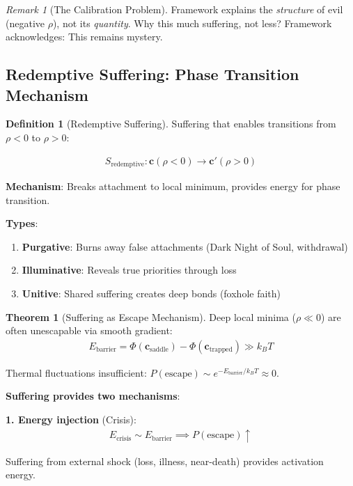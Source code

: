 \documentclass[11pt,a4paper]{article}
\theoremstyle{definition}
\newtheorem{definition}{Definition}[section]
\newtheorem{theorem}{Theorem}[section]
\theoremstyle{remark}
\newtheorem{remark}{Remark}[section]
\newcommand{\cc}{\mathbf{c}}
\begin{document}
\begin{small}
\begin{enumerate}
\begin{remark}[The Calibration Problem]
Framework explains the \textit{structure} of evil (negative \(\rho\)), not its \textit{quantity}. Why this much suffering, not less? Framework acknowledges: This remains mystery.
\end{remark}

\subsection{Redemptive Suffering: Phase Transition Mechanism}

\begin{definition}[Redemptive Suffering]
Suffering that enables transitions from \(\rho < 0\) to \(\rho > 0\):

\begin{align}
S_{\text{redemptive}}: \cc(\rho < 0) \to \cc'(\rho > 0)
\end{align}

\textbf{Mechanism}: Breaks attachment to local minimum, provides energy for phase transition.

\textbf{Types}:
\begin{enumerate}
    \item \textbf{Purgative}: Burns away false attachments (Dark Night of Soul, withdrawal)
    \item \textbf{Illuminative}: Reveals true priorities through loss
    \item \textbf{Unitive}: Shared suffering creates deep bonds (foxhole faith)
\end{enumerate}
\end{definition}

\begin{theorem}[Suffering as Escape Mechanism]
Deep local minima (\(\rho \ll 0\)) are often unescapable via smooth gradient:
\begin{align}
E_{\text{barrier}} = \Phi(\cc_{\text{saddle}}) - \Phi(\cc_{\text{trapped}}) \gg k_B T
\end{align}

Thermal fluctuations insufficient: \(P(\text{escape}) \sim e^{-E_{\text{barrier}}/k_B T} \approx 0\).

\textbf{Suffering provides two mechanisms}:

\textbf{1. Energy injection} (Crisis):
\begin{align}
E_{\text{crisis}} \sim E_{\text{barrier}} \implies P(\text{escape}) \uparrow
\end{align}

Suffering from external shock (loss, illness, near-death) provides activation energy.


\end{theorem}
\end{enumerate}
\end{small}
\end{document}
